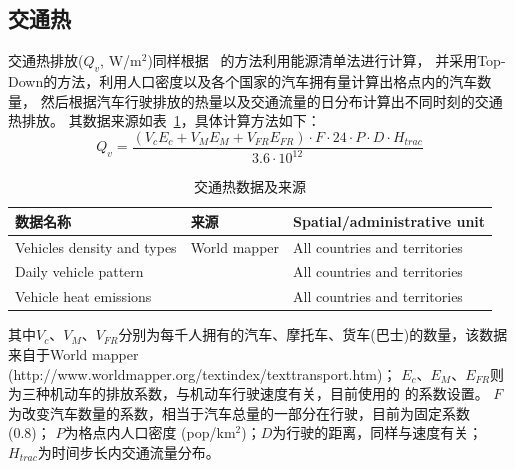\subsection{交通热}
交通热排放($Q_v$, W/m$^2$)同样根据~\citet{allen2011} 的方法利用能源清单法进行计算，
并采用Top-Down的方法，利用人口密度以及各个国家的汽车拥有量计算出格点内的汽车数量，
然后根据汽车行驶排放的热量以及交通流量的日分布计算出不同时刻的交通热排放。
其数据来源如表~\ref{tab:交通热数据及来源}，具体计算方法如下：
\begin{equation}
Q_{v}=\frac{\left(V_{c} E_{c}+V_{M} E_{M}+V_{F R} E_{F R}\right) \cdot F \cdot 24 \cdot P \cdot D \cdot H_{t r a c}}{3.6 \cdot 10^{12}}
\end{equation}
\begin{table}[]
    \centering
\caption{交通热数据及来源}
\label{tab:交通热数据及来源}
    \begin{tabular}{@{}lll@{}}
    \toprule
    数据名称                       & 来源                          & Spatial/administrative unit   \\ \midrule
    Vehicles density and types & World mapper                & All countries and territories \\
    Daily vehicle pattern      & \citet{Hallenbeck1997} & All countries and territories \\
    Vehicle heat emissions     & \citet{smith2009estimating}       & All countries and territories \\ \bottomrule
    \end{tabular}
    \end{table}
其中$V_c$、$V_M$、$V_{FR}$分别为每千人拥有的汽车、摩托车、货车(巴士)的数量，该数据来自于World mapper
(http://www.worldmapper.org/textindex/texttransport.htm)；
$E_c$、$E_M$、$E_{FR}$则为三种机动车的排放系数，与机动车行驶速度有关，目前使用的 \citet{smith2009estimating} 的系数设置。
$F$为改变汽车数量的系数，相当于汽车总量的一部分在行驶，目前为固定系数(0.8)；
$P$为格点内人口密度 (pop/km$^2$)；$D$为行驶的距离，同样与速度有关；$H_{trac}$为时间步长内交通流量分布。